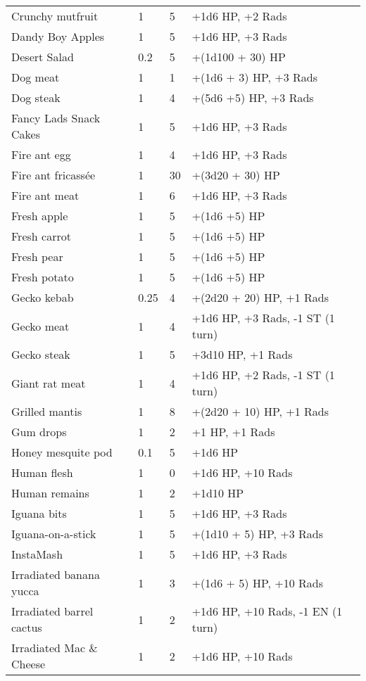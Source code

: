 \begin{longtable}{|p{4cm}|p{1.5cm}|p{1.5cm}|p{9cm}|}
Crunchy mutfruit & 1 & 5 & +1d6 HP, +2 Rads \\
Dandy Boy Apples & 1 & 5 & +1d6 HP, +3 Rads \\
Desert Salad & 0.2 & 5 & +(1d100 + 30) HP \\
Dog meat & 1 & 1 & +(1d6 + 3) HP, +3 Rads \\
Dog steak & 1 & 4 & +(5d6 +5) HP, +3 Rads \\
Fancy Lads Snack Cakes & 1 & 5 & +1d6 HP, +3 Rads \\
Fire ant egg & 1 & 4 & +1d6 HP, +3 Rads \\
Fire ant fricassée & 1 & 30 & +(3d20 + 30) HP \\
Fire ant meat & 1 & 6 & +1d6 HP, +3 Rads \\
Fresh apple & 1 & 5 & +(1d6 +5) HP \\
Fresh carrot & 1 & 5 & +(1d6 +5) HP \\
Fresh pear & 1 & 5 & +(1d6 +5) HP \\
Fresh potato & 1 & 5 & +(1d6 +5) HP \\
Gecko kebab & 0.25 & 4 & +(2d20 + 20) HP, +1 Rads \\
Gecko meat & 1 & 4 & +1d6 HP, +3 Rads, -1 ST (1 turn) \\
Gecko steak & 1 & 5 & +3d10 HP, +1 Rads \\
Giant rat meat & 1 & 4 & +1d6 HP, +2 Rads, -1 ST (1 turn) \\
Grilled mantis & 1 & 8 & +(2d20 + 10) HP, +1 Rads \\
Gum drops & 1 & 2 & +1 HP, +1 Rads \\
Honey mesquite pod & 0.1 & 5 & +1d6 HP \\
Human flesh & 1 & 0 & +1d6 HP, +10 Rads \\
Human remains & 1 & 2 & +1d10 HP \\
Iguana bits & 1 & 5 & +1d6 HP, +3 Rads \\
Iguana-on-a-stick & 1 & 5 & +(1d10 + 5) HP, +3 Rads \\
InstaMash & 1 & 5 & +1d6 HP, +3 Rads \\
Irradiated banana yucca & 1 & 3 & +(1d6 + 5) HP, +10 Rads \\
Irradiated barrel cactus & 1 & 2 & +1d6 HP, +10 Rads, -1 EN (1 turn) \\
Irradiated Mac \& Cheese & 1 & 2 & +1d6 HP, +10 Rads \\

\end{longtable}
